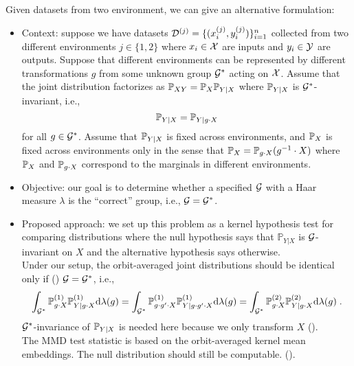 Given datasets from two environment, we can give an alternative formulation:

\begin{itemize}

\item
Context: suppose we have datasets $\mathcal{D}^{(j)}=\{(x_i^{(j)},y_i^{(j)})\}_{i=1}^n$ collected from two different environments $j\in\{1,2\}$ where $x_i\in\mathcal{X}$ are inputs and $y_i\in\mathcal{Y}$ are outputs. Suppose that different environments can be represented by different transformations $g$ from some unknown group $\mathcal{G}^*$ acting on $\mathcal{X}$. Assume that the joint distribution factorizes as $\mathbb{P}_{XY}=\mathbb{P}_X\mathbb{P}_{Y|X}$ where $\mathbb{P}_{Y|X}$ is $\mathcal{G}^*$-invariant, i.e.,
\[
\bbP_{Y|X} = \bbP_{Y|g\cdot X}
\]
for all $g\in\mathcal{G}^*$. Assume that $\mathbb{P}_{Y|X}$ is fixed across environments, and $\mathbb{P}_X$ is fixed across environments only in the sense that $\mathbb{P}_X=\mathbb{P}_{g\cdot X}(g^{-1}\cdot X)$ where $\mathbb{P}_X$ and $\mathbb{P}_{g\cdot X}$ correspond to the marginals in different environments.

\item
Objective: our goal is to determine whether a specified $\mathcal{G}$ with a Haar measure $\lambda$ is the ``correct'' group, i.e., $\mathcal{G}=\mathcal{G}^*$.

\iffalse
\todo If so, then the conditional distribution $\mathbb{P}_{Y|X}$ is invariant to, i.e., whether
\[
\bbP_{Y|X} = \bbP_{Y|g\cdot X}
\]
for all $g\in\calG$ and $X\in\calX$.
\fi

\item
Proposed approach: we set up this problem as a kernel hypothesis test for comparing distributions where the null hypothesis says that $\mathbb{P}_{Y|X}$ is $\mathcal{G}$-invariant on $X$ and the alternative hypothesis says otherwise.
\\

Under our setup, the orbit-averaged joint distributions should be identical only if (\todo) $\mathcal{G}=\mathcal{G}^*$, i.e.,
\[
\int_{\mathcal{G}^*}\mathbb{P}_{g\cdot X}^{(1)}\mathbb{P}_{Y|g\cdot X}^{(1)}\mathrm{d}\lambda(g) = \int_{\mathcal{G}^*}\mathbb{P}_{g\cdot g'\cdot X}^{(1)}\mathbb{P}_{Y|g\cdot g'\cdot X}^{(1)}\mathrm{d}\lambda(g) = \int_{\mathcal{G}^*}\mathbb{P}_{g\cdot X}^{(2)}\mathbb{P}_{Y|g\cdot X}^{(2)}\mathrm{d}\lambda(g)\;.
\]
$\mathcal{G}^*$-invariance of $\mathbb{P}_{Y|X}$ is needed here because we only transform $X$ (\todo).
\\

The MMD test statistic is based on the orbit-averaged kernel mean embeddings. The null distribution should still be computable. (\todo).


\end{itemize}
